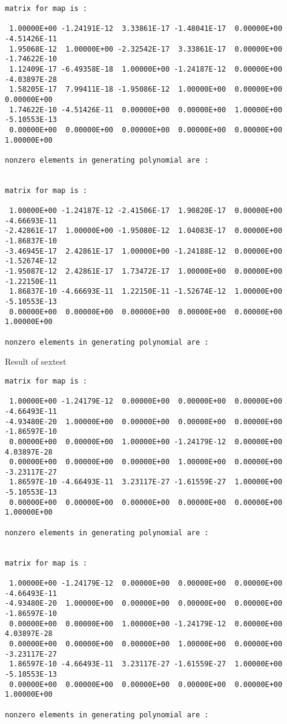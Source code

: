 \begin{footnotesize}
\begin{verbatim}
matrix for map is :

 1.00000E+00 -1.24191E-12  3.33861E-17 -1.48041E-17  0.00000E+00 -4.51426E-11
 1.95068E-12  1.00000E+00 -2.32542E-17  3.33861E-17  0.00000E+00 -1.74622E-10
 1.12409E-17 -6.49358E-18  1.00000E+00 -1.24187E-12  0.00000E+00 -4.03897E-28
 1.58205E-17  7.99411E-18 -1.95086E-12  1.00000E+00  0.00000E+00  0.00000E+00
 1.74622E-10 -4.51426E-11  0.00000E+00  0.00000E+00  1.00000E+00 -5.10553E-13
 0.00000E+00  0.00000E+00  0.00000E+00  0.00000E+00  0.00000E+00  1.00000E+00

nonzero elements in generating polynomial are :


matrix for map is :

 1.00000E+00 -1.24187E-12 -2.41506E-17  1.90820E-17  0.00000E+00 -4.66693E-11
-2.42861E-17  1.00000E+00 -1.95080E-12  1.04083E-17  0.00000E+00 -1.86837E-10
-3.46945E-17  2.42861E-17  1.00000E+00 -1.24188E-12  0.00000E+00 -1.52674E-12
-1.95087E-12  2.42861E-17  1.73472E-17  1.00000E+00  0.00000E+00 -1.22150E-11
 1.86837E-10 -4.66693E-11  1.22150E-11 -1.52674E-12  1.00000E+00 -5.10553E-13
 0.00000E+00  0.00000E+00  0.00000E+00  0.00000E+00  0.00000E+00  1.00000E+00

nonzero elements in generating polynomial are :

\end{verbatim}
\end{footnotesize}
Result of sextest
\begin{footnotesize}
\begin{verbatim}
matrix for map is :

 1.00000E+00 -1.24179E-12  0.00000E+00  0.00000E+00  0.00000E+00 -4.66493E-11
-4.93480E-20  1.00000E+00  0.00000E+00  0.00000E+00  0.00000E+00 -1.86597E-10
 0.00000E+00  0.00000E+00  1.00000E+00 -1.24179E-12  0.00000E+00  4.03897E-28
 0.00000E+00  0.00000E+00  0.00000E+00  1.00000E+00  0.00000E+00 -3.23117E-27
 1.86597E-10 -4.66493E-11  3.23117E-27 -1.61559E-27  1.00000E+00 -5.10553E-13
 0.00000E+00  0.00000E+00  0.00000E+00  0.00000E+00  0.00000E+00  1.00000E+00

nonzero elements in generating polynomial are :


matrix for map is :

 1.00000E+00 -1.24179E-12  0.00000E+00  0.00000E+00  0.00000E+00 -4.66493E-11
-4.93480E-20  1.00000E+00  0.00000E+00  0.00000E+00  0.00000E+00 -1.86597E-10
 0.00000E+00  0.00000E+00  1.00000E+00 -1.24179E-12  0.00000E+00  4.03897E-28
 0.00000E+00  0.00000E+00  0.00000E+00  1.00000E+00  0.00000E+00 -3.23117E-27
 1.86597E-10 -4.66493E-11  3.23117E-27 -1.61559E-27  1.00000E+00 -5.10553E-13
 0.00000E+00  0.00000E+00  0.00000E+00  0.00000E+00  0.00000E+00  1.00000E+00

nonzero elements in generating polynomial are :

\end{verbatim}
\end{footnotesize}
